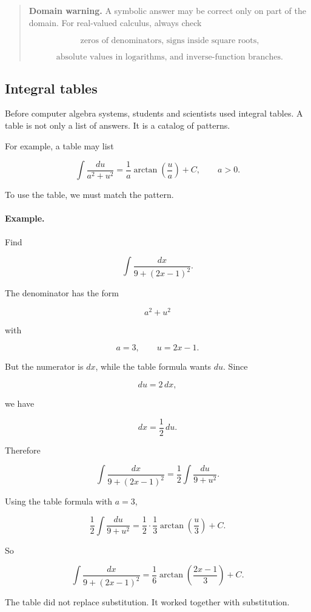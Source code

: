 \begin{quote}
\textbf{Domain warning.}
A symbolic answer may be correct only on part of the domain.  For real-valued calculus,
always check

\[
\text{zeros of denominators, signs inside square roots,}
\]

\[
\text{absolute values in logarithms, and inverse-function branches.}
\]
\end{quote}

\subsection{Integral tables}
\label{subsec:integral-tables}

Before computer algebra systems, students and scientists used integral tables.  A table is
not only a list of answers.  It is a catalog of patterns.

For example, a table may list

\[
\int \frac{du}{a^2+u^2}
=
\frac1a\arctan\left(\frac{u}{a}\right)+C,
\qquad a>0.
\]

To use the table, we must match the pattern.

\paragraph{Example.}
Find

\[
\int \frac{dx}{9+(2x-1)^2}.
\]

The denominator has the form

\[
a^2+u^2
\]

with

\[
a=3,
\qquad
u=2x-1.
\]

But the numerator is \(dx\), while the table formula wants \(du\).  Since

\[
du=2\,dx,
\]

we have

\[
dx=\frac12\,du.
\]

Therefore

\[
\int \frac{dx}{9+(2x-1)^2}
=
\frac12\int \frac{du}{9+u^2}.
\]

Using the table formula with \(a=3\),

\[
\frac12\int \frac{du}{9+u^2}
=
\frac12\cdot\frac13\arctan\left(\frac{u}{3}\right)+C.
\]

So

\[
\boxed{
\int \frac{dx}{9+(2x-1)^2}
=
\frac16\arctan\left(\frac{2x-1}{3}\right)+C.
}
\]

The table did not replace substitution.  It worked together with substitution.

